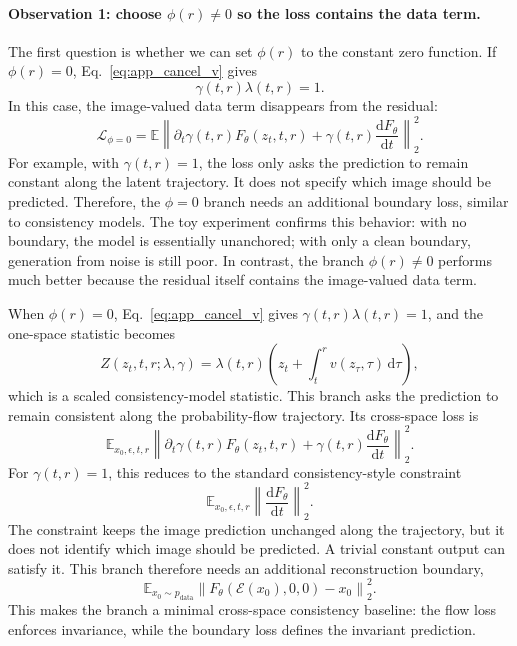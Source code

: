 \paragraph{Observation 1: choose $\phi(r)\neq0$ so the loss contains the data term.}
The first question is whether we can set $\phi(r)$ to the constant zero function. If $\phi(r)=0$, Eq.~\eqref{eq:app_cancel_v} gives
\begin{equation}
\gamma(t,r)\lambda(t,r)=1.
\end{equation}
In this case, the image-valued data term disappears from the residual:
\begin{equation}
\mathcal L_{\phi=0}
=
\mathbb E
\left\|
\partial_t\gamma(t,r)F_\theta(z_t,t,r)
+
\gamma(t,r)\frac{\mathrm d F_\theta}{\mathrm dt}
\right\|_2^2 .
\label{eq:cons_branch}
\end{equation}
For example, with $\gamma(t,r)=1$, the loss only asks the prediction to remain constant along the latent trajectory. It does not specify which image should be predicted. Therefore, the $\phi=0$ branch needs an additional boundary loss, similar to consistency models. The toy experiment confirms this behavior: with no boundary, the model is essentially unanchored; with only a clean boundary, generation from noise is still poor. In contrast, the branch $\phi(r)\neq0$ performs much better because the residual itself contains the image-valued data term.

When $\phi(r)=0$, Eq.~\eqref{eq:app_cancel_v} gives $\gamma(t,r)\lambda(t,r)=1$, and the one-space statistic becomes
\begin{equation}
Z(z_t, t, r; \lambda, \gamma)
=
\lambda(t, r)
\left(
z_t
+
\int_{t}^{r} v(z_\tau,\tau)\,\mathrm d\tau
\right),
\label{eq:consistency_statistic}
\end{equation}
which is a scaled consistency-model statistic. This branch asks the prediction to remain consistent along the probability-flow trajectory. Its cross-space loss is
\begin{equation}
\mathbb E_{x_0,\epsilon,t,r}
\left\|
\partial_t\gamma(t,r)F_\theta(z_t,t,r)
+
\gamma(t,r)\frac{\mathrm dF_\theta}{\mathrm dt}
\right\|_2^2 .
\label{eq:consistency_like_loss}
\end{equation}
For $\gamma(t,r)=1$, this reduces to the standard consistency-style constraint
\begin{equation}
\mathbb E_{x_0,\epsilon,t,r}
\left\|
\frac{\mathrm dF_\theta}{\mathrm dt}
\right\|_2^2 .
\label{eq:standard_consistency_loss}
\end{equation}
The constraint keeps the image prediction unchanged along the trajectory, but it does not identify which image should be predicted. A trivial constant output can satisfy it. This branch therefore needs an additional reconstruction boundary,
\begin{equation}
\mathbb E_{x_0\sim p_{\mathrm{data}}}
\left\|
F_\theta(\mathcal E(x_0),0,0)-x_0
\right\|_2^2 .
\label{eq:reconstruction_boundary}
\end{equation}
This makes the branch a minimal cross-space consistency baseline: the flow loss enforces invariance, while the boundary loss defines the invariant prediction.

